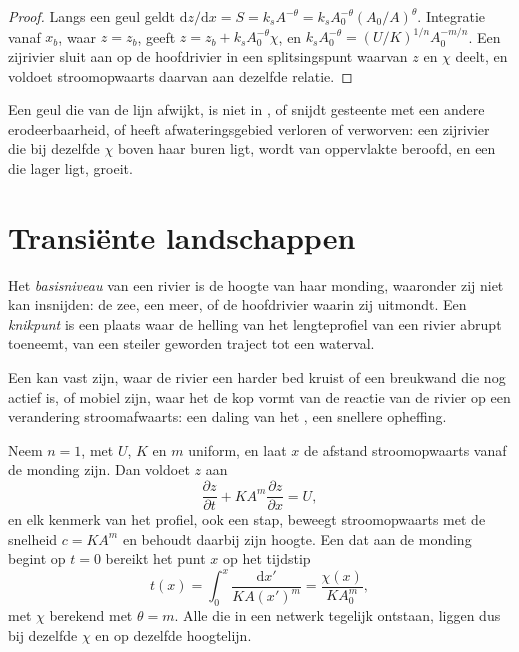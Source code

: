 \begin{proof}
Langs een geul geldt $\mathrm{d}z/\mathrm{d}x = S = k_s A^{-\theta} = k_s
A_0^{-\theta}(A_0/A)^{\theta}$. Integratie vanaf $x_b$, waar $z = z_b$,
geeft $z = z_b + k_s A_0^{-\theta}\chi$, en $k_s A_0^{-\theta} =
(U/K)^{1/n} A_0^{-m/n}$. Een zijrivier sluit aan op de hoofdrivier in een splitsingspunt waarvan
$z$ en $\chi$ deelt, en voldoet stroomopwaarts daarvan aan dezelfde relatie.
\end{proof}

Een geul die van de lijn afwijkt, is niet in , of snijdt
gesteente met een andere erodeerbaarheid, of heeft afwateringsgebied verloren of
verworven: een zijrivier die bij dezelfde $\chi$ boven haar buren ligt, wordt
van oppervlakte beroofd, en een die lager ligt, groeit.

\section{Transiënte landschappen}\label{sec:b3:quantitative-geomorphology:transient}

\begin{definition}\label{def:b3:quantitative-geomorphology:knickpoint}
Het \emph{basisniveau} van een rivier is de hoogte van haar
monding, waaronder zij niet kan insnijden: de zee, een meer, of de hoofdrivier
waarin zij uitmondt. Een \emph{knikpunt} is een plaats waar de
helling van het lengteprofiel van een rivier abrupt toeneemt, van een steiler
geworden traject tot een waterval.
\end{definition}

Een  kan vast zijn, waar de rivier een harder bed kruist of een
breukwand die nog actief is, of mobiel zijn, waar het de kop vormt van de
reactie van de rivier op een verandering stroomafwaarts: een daling van het , een
snellere opheffing.

\begin{theorem}\label{thm:b3:quantitative-geomorphology:kinematic}
Neem $n = 1$, met $U$, $K$ en $m$ uniform, en laat $x$ de afstand stroomopwaarts
vanaf de monding zijn. Dan voldoet $z$ aan
\[
\frac{\partial z}{\partial t} + K A^m \frac{\partial z}{\partial x} = U ,
\]
en elk kenmerk van het profiel, ook een stap, beweegt stroomopwaarts met de
snelheid $c = K A^m$ en behoudt daarbij zijn hoogte. Een  dat aan de
monding begint op $t = 0$ bereikt het punt $x$ op het tijdstip
\[
t(x) = \int_0^x \frac{\mathrm{d}x'}{K A(x')^m} = \frac{\chi(x)}{K A_0^m},
\]
met $\chi$ berekend met $\theta = m$. Alle  die in een netwerk tegelijk
ontstaan, liggen dus bij dezelfde $\chi$ en op dezelfde hoogtelijn.
\end{theorem}

